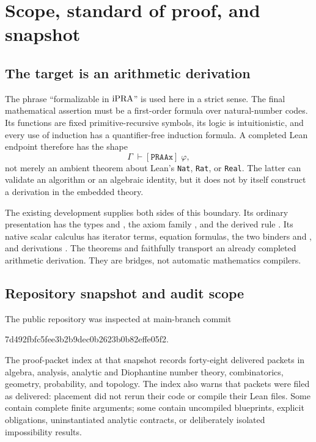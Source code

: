 \section{Scope, standard of proof, and snapshot}
\label{sec:scope}

\subsection{The target is an arithmetic derivation}

The phrase ``formalizable in \(\mathrm{iPRA}\)'' is used here in a strict sense.  The
final mathematical assertion must be a first-order formula over natural-number
codes.  Its functions are fixed primitive-recursive symbols, its logic is
intuitionistic, and every use of induction has a quantifier-free induction
formula.  A completed Lean endpoint therefore has the shape
\[
   \Gamma\;\vdash[\texttt{PRAAx}]\;\varphi,
\]
not merely an ambient theorem about Lean's \texttt{Nat}, \texttt{Rat}, or
\texttt{Real}.  The latter can validate an algorithm or an algebraic identity,
but it does not by itself construct a derivation in the embedded theory.

The existing  development supplies both sides of this
boundary.  Its ordinary presentation has the types  and ,
the axiom family , and the derived rule .  Its
native scalar calculus has iterator terms, equation formulas, the two binders
 and , and derivations .  The theorems
 and  faithfully transport an
already completed arithmetic derivation.  They are bridges, not automatic
mathematics compilers.

\subsection{Repository snapshot and audit scope}

The public repository was inspected at main-branch commit
\begin{center}
\small\ttfamily
7d492fbfc5fee3b2b9dec0b2623b0b82effe05f2.
\end{center}
The proof-packet index at that snapshot records forty-eight delivered packets
in algebra, analysis, analytic and Diophantine number theory, combinatorics,
geometry, probability, and topology.  The index also warns that packets were
filed as delivered: placement did not rerun their code or compile their Lean
files.  Some contain complete finite arguments; some contain uncompiled
blueprints, explicit  obligations, uninstantiated analytic
contracts, or deliberately isolated impossibility results.

